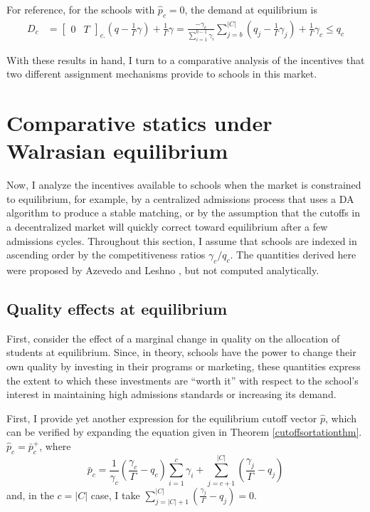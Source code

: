 \documentclass[12pt]{article}
\numberwithin{equation}{subsection}
\theoremstyle{definition}
\begin{document}
For reference, for the schools with $\hat p_c = 0$, the demand at equilibrium is 
\begin{align} \label{demand-pc-eq-zero}
D_c &=
\begin{bmatrix}
0& T
\end{bmatrix}_{c.} \left(q - \frac{1}{\Gamma}\gamma\right) + \frac{1}{\Gamma}\gamma  
= \frac{-\gamma_c}{\sum_{i=1}^{b-1} \gamma_i} \sum_{j=b}^{|C|} \left(q_j - \frac{1}{\Gamma}\gamma_j\right)  + \frac{1}{\Gamma}\gamma_c \leq q_c
\end{align}

With these results in hand, I turn to a comparative analysis of the incentives that two different assignment mechanisms provide to schools in this market.




\section{Comparative statics under Walrasian equilibrium} \label{compstateq}
Now, I analyze the incentives available to schools when the market is constrained to equilibrium, for example, by a centralized admissions process that uses a DA algorithm to produce a stable matching, or by the assumption that the cutoffs in a decentralized market will quickly correct toward equilibrium after a few admissions cycles. Throughout this section, I assume that schools are indexed in ascending order by the competitiveness ratios $\gamma_c / q_c$. The quantities derived here were proposed by Azevedo and Leshno \parencite*{supplydemandfw}, but not computed analytically.

\subsection{Quality effects at equilibrium} \label{qualityeffectsateq}
First, consider the effect of a marginal change in quality on the allocation of students at equilibrium. Since, in theory, schools have the power to change their own quality by investing in their programs or marketing, these quantities express the extent to which these investments are ``worth it'' with respect to the school's interest in maintaining high admissions standards or increasing its demand. 

First, I provide yet another expression for the equilibrium cutoff vector $\hat p$, which can be verified by expanding the equation given in Theorem \ref{cutoffsortationthm}. $\hat p_c = \bar p_c^+$, where
\begin{equation} \label{yetanothereqcutoff}
\bar p_c = 
\frac{1}{\gamma_c} \left(\frac{\gamma_c}{\Gamma} - q_c\right) \sum_{i=1}^{c} \gamma_i 
+ \sum_{j=c+1}^{|C|} \left( \frac{\gamma_j}{\Gamma} - q_j \right)
\end{equation}
and, in the $c = |C|$ case, I take $\sum_{j=|C|+1}^{|C|} \left( \frac{\gamma_j}{\Gamma} - q_j \right)= 0$. 
\end{document}
